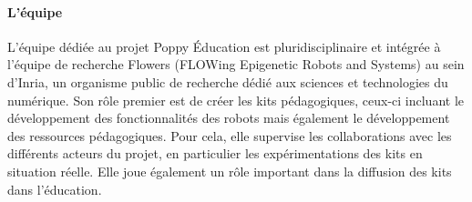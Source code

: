         \paragraph{L'équipe}
            L'équipe dédiée au projet Poppy Éducation est pluridisciplinaire et intégrée à l'équipe de recherche Flowers (FLOWing Epigenetic Robots and Systems) au sein d'Inria, un organisme public de recherche dédié aux sciences et technologies du numérique.
            Son rôle premier est de créer les kits pédagogiques, ceux-ci incluant le développement des fonctionnalités des robots mais également le développement des ressources pédagogiques. Pour cela, elle supervise les collaborations avec les différents acteurs du projet, en particulier les expérimentations des kits en situation réelle. Elle joue également un rôle important dans la diffusion des kits dans l’éducation.

